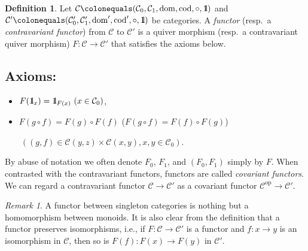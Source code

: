 \documentclass{surv-l}
\numberwithin{equation}{chapter}
\numberwithin{figure}{chapter}
\theoremstyle{plain}
\theoremstyle{definition}
\newtheorem{dfn}[thm]{Definition}
\theoremstyle{remark}
\newtheorem{rmk}[thm]{Remark}
\newcommand{\id}{1\kern-.25em{\text{{\rm l}}}}
\DeclareMathOperator{\dom}{dom}
\DeclareMathOperator{\cod}{cod}
\begin{document}
\begin{dfn}
Let ${\mathcal{C}}\colonequals ({\mathcal{C}}_0, {\mathcal{C}}_1, \dom,\cod,\circ,\id)$ and
${\mathcal{C}}'\colonequals ({\mathcal{C}}'_0, {\mathcal{C}}'_1, \dom',\linebreak[3] \cod',\circ,\id)$ be categories.
A \emph{functor} (resp.\ a \emph{contravariant functor}) from ${\mathcal{C}}$ to ${\mathcal{C}}'$
is a quiver morphism (resp.\ a contravariant quiver morphism)
$F\colon {\mathcal{C}} \to {\mathcal{C}}'$ that satisfies the axioms below.

\subsection*{Axioms:}
\begin{itemize}
\item
$F(\id_x) = \id_{F(x)}\ (x \in {\mathcal{C}}_0)$,
\item
$F(g\circ f) = F(g) \circ F(f)$ \quad ($F(g\circ f) =
F(f) \circ F(g)$)

$\ ((g,f) \in {\mathcal{C}}(y,z)\times {\mathcal{C}}(x,y), x, y \in {\mathcal{C}}_0)$.
\end{itemize}
By abuse of notation we often denote $F_0$, $F_1$, and $(F_0, F_1)$ simply by $F$.
When contrasted with the contravariant functors,
functors are called \emph{covariant functors}.
We can regard a contravariant functor ${\mathcal{C}} \to {\mathcal{C}}'$
as a covariant functor ${\mathcal{C}}^{\mathrm{op}} \to {\mathcal{C}}'$.

\end{dfn}

\begin{rmk}
A functor between singleton categories is nothing but a homomorphism between monoids.
It is also clear from the definition that a functor preserves isomorphisms,
i.e.,
if $F \colon {\mathcal{C}} \to {\mathcal{C}}'$ is a functor and $f \colon x \to y$ is an isomorphism
in ${\mathcal{C}}$, then so is $F(f) \colon F(x) \to F(y)$ in ${\mathcal{C}}'$.
\end{rmk}
\end{document}
